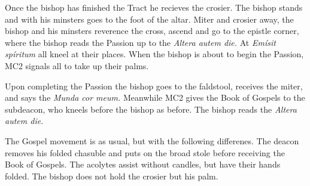 {\rubric Once the bishop has finished the Tract he recieves the crosier. The
bishop stands and with his minsters goes to the foot of the altar. Miter and
crosier away, the bishop and his minsters reverence the cross, ascend and go to
the epistle corner, where the bishop reads the Passion up to the \textit{Altera
autem die.} At \textit{Emísit spíritum} all kneel at their places. When the
bishop is about to begin the Passion, MC2 signals all to take up their palms.

\rubric Upon completing the Passion the bishop goes to the faldstool, receives
the miter, and says the \textit{Munda cor meum.} Meanwhile MC2 gives the Book
of Gospels to the subdeacon, who kneels before the bishop as before. The bishop
reads the \textit{Altera autem die.}

\rubric The Gospel movement is as usual, but with the following differenes. The
deacon removes his folded chasuble and puts on the broad stole before receiving
the Book of Gospels. The acolytes assist without candles, but have their hands
folded. The bishop does not hold the crosier but his palm.

}
